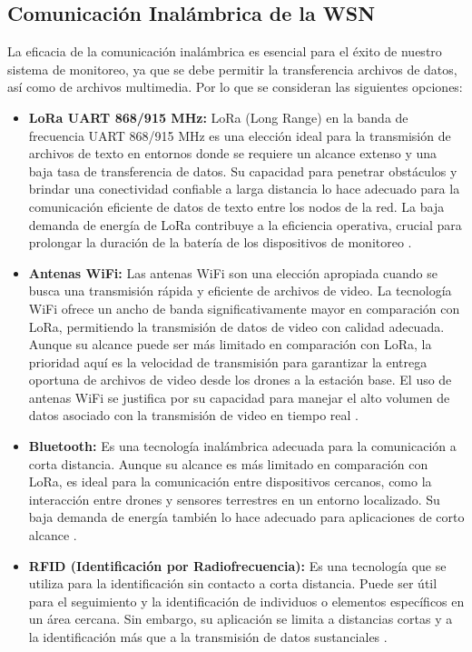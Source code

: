\subsection{Comunicación Inalámbrica de la WSN}
La eficacia de la comunicación inalámbrica es esencial para el éxito de nuestro sistema de monitoreo, ya que se debe permitir la transferencia archivos de datos, así como de archivos multimedia. Por lo que se consideran las siguientes opciones:
\begin{itemize}
\item \textbf{LoRa UART 868/915 MHz:} LoRa (Long Range) en la banda de frecuencia UART 868/915 MHz es una elección ideal para la transmisión de archivos de texto en entornos donde se requiere un alcance extenso y una baja tasa de transferencia de datos. Su capacidad para penetrar obstáculos y brindar una conectividad confiable a larga distancia lo hace adecuado para la comunicación eficiente de datos de texto entre los nodos de la red. La baja demanda de energía de LoRa contribuye a la eficiencia operativa, crucial para prolongar la duración de la batería de los dispositivos de monitoreo \cite{lora}.
\item \textbf{Antenas WiFi:}
Las antenas WiFi son una elección apropiada cuando se busca una transmisión rápida y eficiente de archivos de video. La tecnología WiFi ofrece un ancho de banda significativamente mayor en comparación con LoRa, permitiendo la transmisión de datos de video con calidad adecuada. Aunque su alcance puede ser más limitado en comparación con LoRa, la prioridad aquí es la velocidad de transmisión para garantizar la entrega oportuna de archivos de video desde los drones a la estación base. El uso de antenas WiFi se justifica por su capacidad para manejar el alto volumen de datos asociado con la transmisión de video en tiempo real \cite{119}.
\item \textbf{Bluetooth:} Es una tecnología inalámbrica adecuada para la comunicación a corta distancia. Aunque su alcance es más limitado en comparación con LoRa, es ideal para la comunicación entre dispositivos cercanos, como la interacción entre drones y sensores terrestres en un entorno localizado. Su baja demanda de energía también lo hace adecuado para aplicaciones de corto alcance \cite{bluetooth}.
\item \textbf{RFID (Identificación por Radiofrecuencia):} Es una tecnología que se utiliza para la identificación sin contacto a corta distancia. Puede ser útil para el seguimiento y la identificación de individuos o elementos específicos en un área cercana. Sin embargo, su aplicación se limita a distancias cortas y a la identificación más que a la transmisión de datos sustanciales \cite{rfid}.
\end{itemize}
